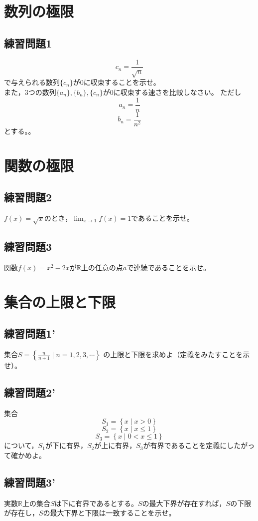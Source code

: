 \documentclass[uplatex]{jsreport}
\begin{document}
  \chapter{数列の極限}
    \section*{練習問題1}
    $$c_n=\frac{1}{\sqrt{n}}$$
    で与えられる数列$\{ c_n \}$が0に収束することを示せ。\\
    また，3つの数列$\{ a_n\},\{b_n\},\{c_n\}$が0に収束する速さを比較しなさい。
    ただし
    $$
    a_n = \frac{1}{n}
    $$
    $$
    b_n = \frac{1}{n^2}
    $$
    とする。。
  \chapter{関数の極限}
    \section{練習問題2}
    $ f(x)=\sqrt{x} $のとき，$ \displaystyle \lim_{x \to 1}{f(x)}=1$であることを示せ。
    \section{練習問題3}
    関数$ f(x)=x^2-2x $が$ \mathbb{R} $上の任意の点$a$で連続であることを示せ。
  \chapter{集合の上限と下限}
    \section{練習問題1’}
    集合$ S= \displaystyle \left\{ \frac{n}{n+1} \mid n=1,2,3,\cdots \right\}$ の上限と下限を求めよ（定義をみたすことを示せ）。
    \section{練習問題2’}
    集合
    $$ S_1=\left\{x \mid x>0 \right\} $$
    $$ S_2=\left\{x \mid x \leq 1 \right\} $$
    $$ S_3=\left\{x \mid 0<x \leq 1 \right\} $$
    について，$S_1$が下に有界，$S_2$が上に有界，$S_3$が有界であることを定義にしたがって確かめよ。
    \section{練習問題3’}
    実数$ \mathbb{R} $上の集合$S$は下に有界であるとする。$S$の最大下界が存在すれば，$S$の下限が存在し，$S$の最大下界と下限は一致することを示せ。
\end{document}
